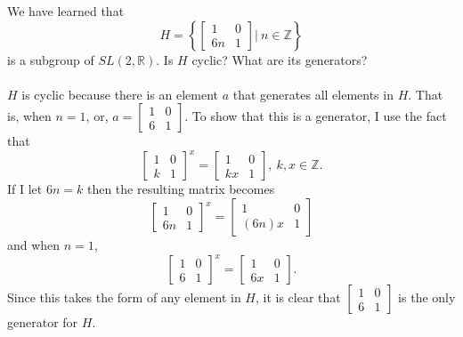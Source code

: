 \documentclass[titlepage]{article}
\newenvironment{problem}[2][Problem]{\begin{trivlist}
\item[\hskip \labelsep {\bfseries #1}\hskip \labelsep {\bfseries #2.}]}{\end{trivlist}}
\begin{document}
 
\fancyhf{}
\cfoot{\thepage}

\begin{problem}{1}
We have learned that 
$$ H = \left\{\begin{bmatrix} 1&0 \\ 6n & 1 \end{bmatrix} \bigg| \ n \in \mathbb{Z}\right\}$$
is a subgroup of $SL(2,\mathbb{R})$. Is $H$ cyclic? What are its generators?
\\
\\
$H$ is cyclic because there is an element $a$ that generates all elements in $H$. That is, when $n = 1$, or, $a = \left[\begin{smallmatrix} 1 & 0 \\ 6 & 1 \end{smallmatrix}\right]$. To show that this is a generator, I use the fact that 
$$\begin{bmatrix}1&0\\k&1 \end{bmatrix}^x = \begin{bmatrix}1&0\\kx & 1\end{bmatrix},\ k,x \in \mathbb{Z}.$$
If I let $6n = k$ then the resulting matrix becomes 
$$\begin{bmatrix} 1&0\\6n & 1\end{bmatrix}^x = \begin{bmatrix}1 & 0 \\ (6n)x & 1 \end{bmatrix}$$
and when $n = 1$,
$$\begin{bmatrix} 1&0\\6 & 1\end{bmatrix}^x = \begin{bmatrix}1&0\\6x & 1\end{bmatrix}.$$
Since this takes the form of any element in $H$, it is clear that $\left[\begin{smallmatrix} 1&0 \\6 & 1 \end{smallmatrix}\right]$ is the only generator for $H$.
\end{problem}
\end{document}
